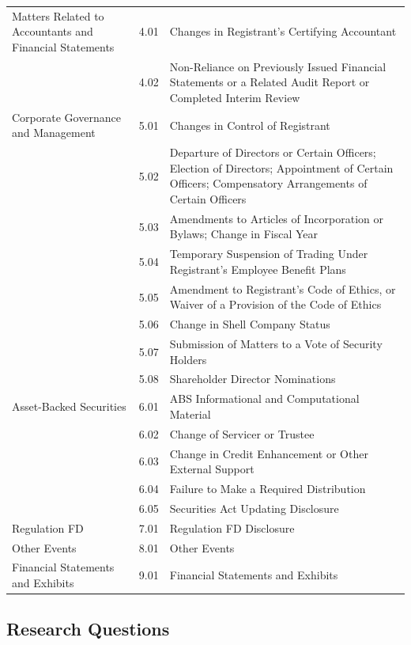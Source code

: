 \documentclass{article}
\begin{document}
\begin{table}[h!]
\begin{tabularx}{\textwidth}{|X|l|X|}
			Matters Related to Accountants and Financial Statements & 4.01 & Changes in Registrant's Certifying Accountant \\
			& 4.02 & Non-Reliance on Previously Issued Financial Statements or a Related Audit Report or Completed Interim Review \\
			Corporate Governance and Management & 5.01 & Changes in Control of Registrant \\
			& 5.02 & Departure of Directors or Certain Officers; Election of Directors; Appointment of Certain Officers; Compensatory Arrangements of Certain Officers \\
			& 5.03 & Amendments to Articles of Incorporation or Bylaws; Change in Fiscal Year \\
			& 5.04 & Temporary Suspension of Trading Under Registrant's Employee Benefit Plans \\
			& 5.05 & Amendment to Registrant's Code of Ethics, or Waiver of a Provision of the Code of Ethics \\
			& 5.06 & Change in Shell Company Status \\
			& 5.07 & Submission of Matters to a Vote of Security Holders \\
			& 5.08 & Shareholder Director Nominations \\
			Asset-Backed Securities & 6.01 & ABS Informational and Computational Material \\
			& 6.02 & Change of Servicer or Trustee \\
			& 6.03 & Change in Credit Enhancement or Other External Support \\
			& 6.04 & Failure to Make a Required Distribution \\
			& 6.05 & Securities Act Updating Disclosure \\
			Regulation FD & 7.01 & Regulation FD Disclosure \\
			Other Events & 8.01 & Other Events \\
			Financial Statements and Exhibits & 9.01 & Financial Statements and Exhibits \\
			\bottomrule
		\end{tabularx}

	\end{table}%



	
	\subsection{Research Questions}
	
\end{document}
